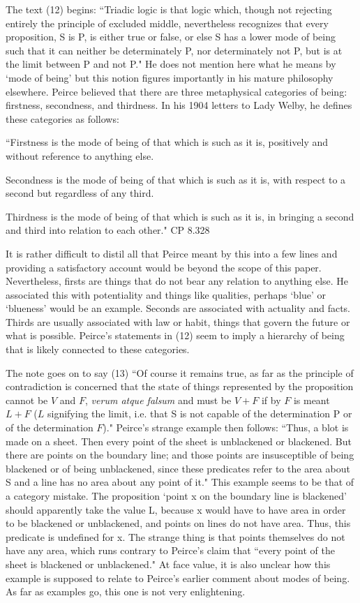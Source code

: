 \documentclass[12pt]{article}
\begin{document}
The text (12) begins: ``Triadic logic is that logic which, though not rejecting entirely the principle of excluded middle, nevertheless recognizes that every proposition, S is P, is either true or false, or else S has a lower mode of being such that it can neither be determinately P, nor determinately not P, but is at the limit between P and not P." He does not mention here what he means by `mode of being' but this notion figures importantly in his mature philosophy elsewhere. Peirce believed that there are three metaphysical categories of being: firstness, secondness, and thirdness. In his 1904 letters to Lady Welby, he defines these categories as follows:
\begin{singlespace}
``Firstness is the mode of being of that which is such as it is, positively and without reference to anything else.

Secondness is the mode of being of that which is such as it is, with respect to a second but regardless of any third.

Thirdness is the mode of being of that which is such as it is, in bringing a second and third into relation to each other." CP 8.328
\end{singlespace}
It is rather difficult to distil all that Peirce meant by this into a few lines and providing a satisfactory account would be beyond the scope of this paper. Nevertheless, firsts are things that do not bear any relation to anything else. He associated this with potentiality and things like qualities, perhaps `blue' or `blueness' would be an example. Seconds are associated with actuality and facts. Thirds are usually associated with law or habit, things that govern the future or what is possible. Peirce's statements in (12) seem to imply a hierarchy of being that is likely connected to these categories.

The note goes on to say (13) ``Of course it remains true, as far as the principle of contradiction is concerned that the state of things represented by the proposition cannot be $V$ and $F$, \textit{verum atque falsum} and must be $V+F$ if by $F$ is meant $L+F$ ($L$ signifying the limit, i.e. that S is not capable of the determination P or of the determination $F$)." Peirce's strange example then follows: ``Thus, a blot is made on a sheet. Then every point of the sheet is unblackened or blackened. But there are points on the boundary line; and those points are insusceptible of being blackened or of being unblackened, since these predicates refer to the area about S and a line has no area about any point of it." This example seems to be that of a category mistake. The proposition `point x on the boundary line is blackened' should apparently take the value L, because x would have to have area in order to be blackened or unblackened, and points on lines do not have area. Thus, this predicate is undefined for x. The strange thing is that points themselves do not have any area, which runs contrary to Peirce's claim that ``every point of the sheet is blackened or unblackened." At face value, it is also unclear how this example is supposed to relate to Peirce's earlier comment about modes of being. As far as examples go, this one is not very enlightening.
\end{document}
